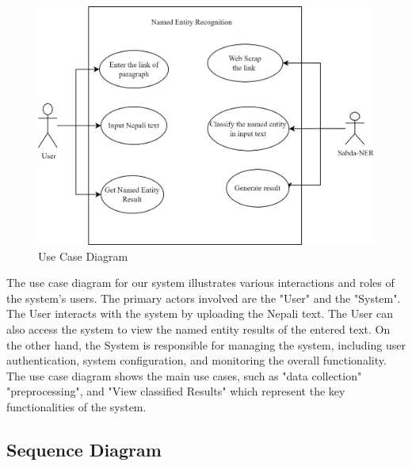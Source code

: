  \begin{figure}[H]
\centering
\includegraphics [scale=1.1]{img/systemBlock-etc/Use Case Diagram.png}
\caption[ Use Case Diagram]{ Use Case Diagram}

\end{figure}

 
The use case diagram for our system illustrates various interactions and roles of the system’s users. The primary actors involved are the "User" and the "System". The User interacts with the system by uploading the Nepali text. The User can also access the system to view the named entity results of the entered text. On the other hand, the System is responsible for managing the system, including user authentication, system configuration, and monitoring the overall functionality. The use case diagram shows the main use cases, such as "data collection" "preprocessing", and "View classified Results" which represent the key functionalities of the system.



\subsection{Sequence Diagram} 
\vspace{30pt} %

